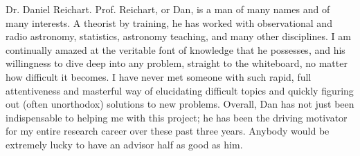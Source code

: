 Dr. Daniel Reichart. Prof. Reichart, or Dan, is a man of many names and of many interests. A theorist by training, he has worked with observational and radio astronomy, statistics, astronomy teaching, and many other disciplines. I am continually amazed at the veritable font of knowledge that he possesses, and his willingness to dive deep into any problem, straight to the whiteboard, no matter how difficult it becomes. I have never met someone with such rapid, full attentiveness and masterful way of elucidating difficult topics and quickly figuring out (often unorthodox) solutions to new problems. Overall, Dan has not just been indispensable to helping me with this project; he has been the driving motivator for my entire research career over these past three years. Anybody would be extremely lucky to have an advisor half as good as him.
